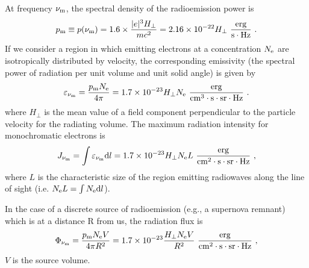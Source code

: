 \documentclass[12pt,a4paper]{article}
\newcommand{\dif}{\mathrm{d}}
\begin{document}
At frequency $\nu_{\rm m}$, the spectral density of the radioemission power is
\begin{align}
p_{\rm m} \equiv p(\nu_{\rm m}) = 1.6 \times \dfrac{|e|^3 H_\perp}{mc^2} = 2.16 \times 10^{-22} H_\perp ~\rm \dfrac{erg}{s \cdot  Hz} ~.
\end{align}
If we consider a region in which emitting electrons at a concentration $N_{\rm e}$ are isotropically distributed by velocity, the corresponding emissivity (the spectral power of radiation per unit volume and unit solid angle) is given by
\begin{align}
\varepsilon_{\nu_{\rm m}} = \dfrac{p_{\rm m} N_{\rm e}}{4\pi} = 1.7 \times 10^{-23} H_\perp N_{\rm e} ~\rm \dfrac{erg}{cm^3 \cdot s \cdot sr \cdot Hz} ~.
\end{align}
where $H_\perp$ is the mean value of a field component perpendicular to the particle velocity for the radiating volume. The maximum radiation intensity for monochromatic electrons is
\begin{align}
J_{\nu_{\rm m}} = \int \varepsilon_{\nu_{\rm m}} \dif l = 1.7 \times 10^{-23} H_\perp N_{\rm e} L ~\rm \dfrac{erg}{cm^2 \cdot s \cdot sr \cdot Hz} ~,
\end{align}
where $L$ is the characteristic size of the region emitting radiowaves along the line of sight (i.e. $N_{\rm e}L = \int N_{\rm e} \dif l$).

In the case of a discrete source of radioemission (e.g., a supernova remnant) which is at a distance R from us, the radiation flux is
\begin{align}
\Phi_{\nu_{\rm m}} = \dfrac{p_{\rm m} N_{\rm e} V}{4\pi R^2} = 1.7 \times 10^{-23} \dfrac{H_\perp N_{\rm e} V}{R^2} ~\rm \dfrac{erg}{cm^2 \cdot s \cdot sr \cdot Hz} ~,
\end{align}
$V$ is the source volume.
\end{document}
